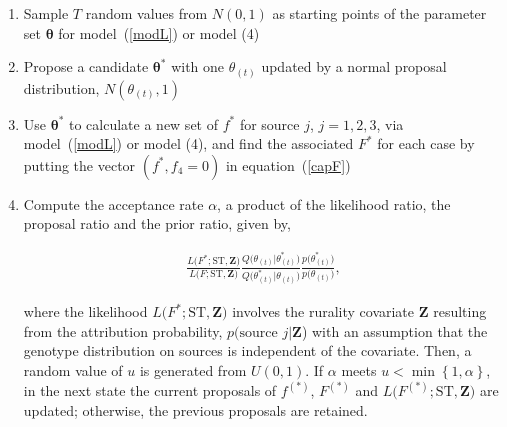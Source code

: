 \documentclass[times, doublespace]{WileyNJD-v2}%
\begin{document}
\begin{enumerate}

\item Sample $T$ random values from $N(0,1)$ as starting points of the parameter set $\boldsymbol{\theta}$ for model~(\ref{modL}) or model (4) 

\item Propose a candidate $\boldsymbol{\theta}^*$ with one $\theta_{(t)}$ updated by a normal proposal distribution, $N(\theta_{(t)}, 1)$

\item Use $\boldsymbol{\theta}^*$ to calculate a new set of $f^*$ for source $j$, $j=1, 2, 3$, via model~(\ref{modL}) or model (4), and find the associated $F^*$ for each case by putting the vector $(f^*, f_4=0)$ in equation~(\ref{capF}) 
  
\item Compute the acceptance rate $\alpha$, a product of the likelihood ratio, the proposal ratio and the prior ratio, given by,

\begin{align*}
\frac{L\Big(F^*; \text{ST}, \boldsymbol{Z}\Big)}{L\Big(F; \text{ST}, \boldsymbol{Z}\Big)}\frac{Q\Big(\theta_{(t)} \vert \theta_{(t)}^*\Big)}{Q\Big(\theta_{(t)}^* \vert \theta_{(t)}\Big)}\frac{p\Big(\theta_{(t)}^*\Big)}{p\Big(\theta_{(t)}\Big)}, 
\end{align*}

where the likelihood $L\Big(F^*; \text{ST}, \boldsymbol{Z}\Big)$ involves the rurality covariate $\boldsymbol{Z}$ resulting from the attribution probability, $p(\text{source }j\vert \boldsymbol{Z}$) with an assumption that the genotype distribution on sources is independent of the covariate. Then, a random value of $u$ is generated from $U(0,1)$. If $\alpha$ meets $u < \min \left\{1, \alpha \right\}$, in the next state the current proposals of $f^{(*)}$, $F^{(*)}$ and $L\Big(F^{(*)}; \text{ST}, \boldsymbol{Z}\Big)$ are updated; otherwise, the previous proposals are retained. 
\end{enumerate}


\end{document}
